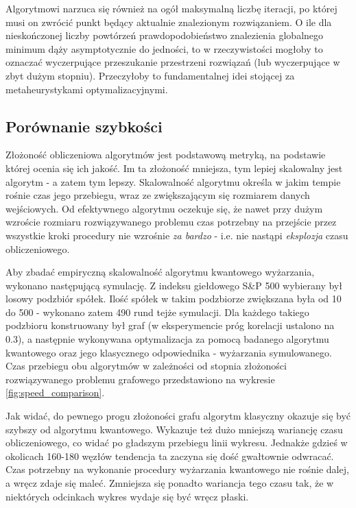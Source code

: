 \documentclass[12pt,a4paper,twoside,openany]{book}
\begin{document}
Algorytmowi narzuca się również na ogół maksymalną liczbę iteracji, po której musi on zwrócić punkt będący aktualnie znalezionym rozwiązaniem.
O ile dla nieskończonej liczby powtórzeń prawdopodobieństwo znalezienia globalnego minimum dąży asymptotycznie do jedności, to w rzeczywistości mogłoby to oznaczać wyczerpujące przeszukanie przestrzeni rozwiązań (lub wyczerpujące w zbyt dużym stopniu).
Przeczyłoby to fundamentalnej idei stojącej za metaheurystykami optymalizacyjnymi.


\subsection{Porównanie szybkości}
\label{subsec:speed_comparison}

Złożoność obliczeniowa algorytmów jest podstawową metryką, na podstawie której ocenia się ich jakość.
Im ta złożoność mniejsza, tym lepiej skalowalny jest algorytm - a zatem tym lepszy.
Skalowalność algorytmu określa w jakim tempie rośnie czas jego przebiegu, wraz ze zwiększającym się rozmiarem danych wejściowych. Od efektywnego algorytmu oczekuje się, że nawet przy dużym wzroście rozmiaru rozwiązywanego problemu czas potrzebny na przejście przez wszystkie kroki procedury nie wzrośnie \textit{za bardzo} - i.e. nie nastąpi \textit{eksplozja} czasu obliczeniowego.


Aby zbadać empiryczną skalowalność algorytmu kwantowego wyżarzania, wykonano następującą symulację.
Z indeksu giełdowego S\&P 500 wybierany był losowy podzbiór spółek.
Ilość spółek w takim podzbiorze zwiększana była od 10 do 500 - wykonano zatem 490 rund tejże symulacji.
Dla każdego takiego podzbioru konstruowany był graf (w eksperymencie próg korelacji ustalono na 0.3), a następnie wykonywana optymalizacja za pomocą badanego algorytmu kwantowego oraz jego klasycznego odpowiednika - wyżarzania symulowanego.
Czas przebiegu obu algorytmów w zależności od stopnia złożoności rozwiązywanego problemu grafowego przedstawiono na wykresie \ref{fig:speed_comparison}.

Jak widać, do pewnego progu złożoności grafu algorytm klasyczny okazuje się być szybszy od algorytmu kwantowego.
Wykazuje też dużo mniejszą wariancję czasu obliczeniowego, co widać po gładszym przebiegu linii wykresu.
Jednakże gdzieś w okolicach 160-180 węzłów tendencja ta zaczyna się dość gwałtownie odwracać.
Czas potrzebny na wykonanie procedury wyżarzania kwantowego nie rośnie dalej, a wręcz zdaje się maleć.
Zmniejsza się ponadto wariancja tego czasu tak, że w niektórych odcinkach wykres wydaje się być wręcz płaski.
\end{document}
